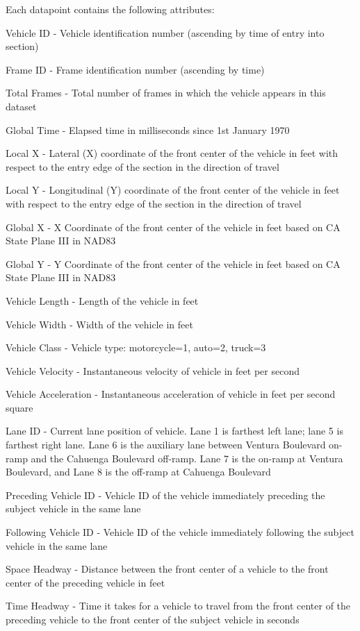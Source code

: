 \documentclass[11pt]{uonthesis}
\begin{document}
Each datapoint contains the following attributes:
\begin{description}
    \item Vehicle ID - Vehicle identification number (ascending by time of entry into section)
    \item Frame ID - Frame identification number (ascending by time)
    \item Total Frames - Total number of frames in which the vehicle appears in this dataset
    \item Global Time - Elapsed time in milliseconds since 1st January 1970
    \item Local X - Lateral (X) coordinate of the front center of the vehicle in feet with respect to the entry edge of the section in the direction of travel
    \item Local Y - Longitudinal (Y) coordinate of the front center of the vehicle in feet with respect to the entry edge of the section in the direction of travel
    \item Global X - X Coordinate of the front center of the vehicle in feet based on CA State Plane III in NAD83
    \item Global Y - Y Coordinate of the front center of the vehicle in feet based on CA State Plane III in NAD83
    \item Vehicle Length - Length of the vehicle in feet
    \item Vehicle Width - Width of the vehicle in feet
    \item Vehicle Class - Vehicle type: motorcycle=1, auto=2, truck=3
    \item Vehicle Velocity - Instantaneous velocity of vehicle in feet per second
    \item Vehicle Acceleration - Instantaneous acceleration of vehicle in feet per second square
    \item Lane ID - Current lane position of vehicle. Lane 1 is farthest left lane; lane 5 is farthest right lane. Lane 6 is the auxiliary lane between Ventura Boulevard on-ramp and the Cahuenga Boulevard off-ramp. Lane 7 is the on-ramp at Ventura Boulevard, and Lane 8 is the off-ramp at Cahuenga Boulevard
    \item Preceding Vehicle ID - Vehicle ID of the vehicle immediately preceding the subject vehicle in the same lane
    \item Following Vehicle ID - Vehicle ID of the vehicle immediately following the subject vehicle in the same lane
    \item Space Headway - Distance between the front center of a vehicle to the front center of the preceding vehicle in feet
    \item Time Headway - Time it takes for a vehicle to travel from the front center of the preceding vehicle to the front center of the subject vehicle in seconds
\end{description}
\end{document}
